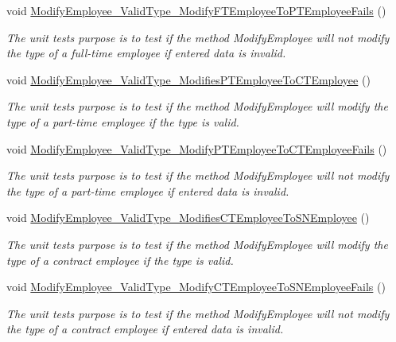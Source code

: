\begin{DoxyCompactItemize}
void \hyperlink{class_the_company_1_1_tests_1_1_modify_employee_tests_a90300d010898e9ba9e5113c307017041}{Modify\+Employee\+\_\+\+Valid\+Type\+\_\+\+Modify\+F\+T\+Employee\+To\+P\+T\+Employee\+Fails} ()
\begin{DoxyCompactList}\small\item\em The unit test\textquotesingle{}s purpose is to test if the method Modify\+Employee will not modify the type of a full-\/time employee if entered data is invalid. \end{DoxyCompactList}\item 
void \hyperlink{class_the_company_1_1_tests_1_1_modify_employee_tests_ae0ae2178f7bdfe10147afa7b6206e614}{Modify\+Employee\+\_\+\+Valid\+Type\+\_\+\+Modifies\+P\+T\+Employee\+To\+C\+T\+Employee} ()
\begin{DoxyCompactList}\small\item\em The unit test\textquotesingle{}s purpose is to test if the method Modify\+Employee will modify the type of a part-\/time employee if the type is valid. \end{DoxyCompactList}\item 
void \hyperlink{class_the_company_1_1_tests_1_1_modify_employee_tests_a06b72867a3012c1ab1a047da91cd4b3a}{Modify\+Employee\+\_\+\+Valid\+Type\+\_\+\+Modify\+P\+T\+Employee\+To\+C\+T\+Employee\+Fails} ()
\begin{DoxyCompactList}\small\item\em The unit test\textquotesingle{}s purpose is to test if the method Modify\+Employee will not modify the type of a part-\/time employee if entered data is invalid. \end{DoxyCompactList}\item 
void \hyperlink{class_the_company_1_1_tests_1_1_modify_employee_tests_aba30ffe56ad23b8e29efd213b90d297e}{Modify\+Employee\+\_\+\+Valid\+Type\+\_\+\+Modifies\+C\+T\+Employee\+To\+S\+N\+Employee} ()
\begin{DoxyCompactList}\small\item\em The unit test\textquotesingle{}s purpose is to test if the method Modify\+Employee will modify the type of a contract employee if the type is valid. \end{DoxyCompactList}\item 
void \hyperlink{class_the_company_1_1_tests_1_1_modify_employee_tests_a59552262db6dfe1c078eb6c2f1438fe9}{Modify\+Employee\+\_\+\+Valid\+Type\+\_\+\+Modify\+C\+T\+Employee\+To\+S\+N\+Employee\+Fails} ()
\begin{DoxyCompactList}\small\item\em The unit test\textquotesingle{}s purpose is to test if the method Modify\+Employee will not modify the type of a contract employee if entered data is invalid. \end{DoxyCompactList}\item 

\end{DoxyCompactItemize}
